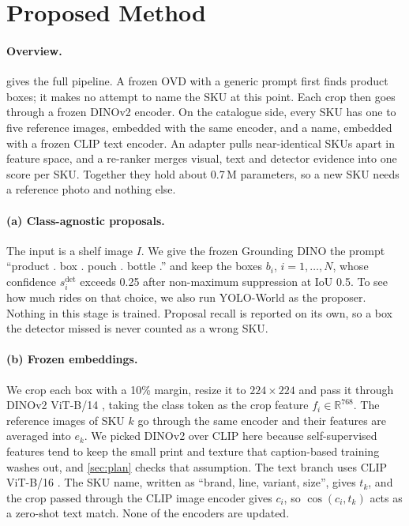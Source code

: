\section{Proposed Method}
\label{sec:method}

\paragraph{Overview.}
 gives the full pipeline. A frozen OVD with a generic prompt first finds product boxes; it makes no attempt to name the SKU at this point. Each crop then goes through a frozen DINOv2 encoder. On the catalogue side, every SKU has one to five reference images, embedded with the same encoder, and a name, embedded with a frozen CLIP text encoder. An adapter pulls near-identical SKUs apart in feature space, and a re-ranker merges visual, text and detector evidence into one score per SKU. Together they hold about 0.7\,M parameters, so a new SKU needs a reference photo and nothing else.

\paragraph{(a) Class-agnostic proposals.}
The input is a shelf image $I$. We give the frozen Grounding DINO \cite{liu2024groundingdino} the prompt ``product . box . pouch . bottle .'' and keep the boxes $b_i$, $i=1,\dots,N$, whose confidence $s^{\mathrm{det}}_i$ exceeds 0.25 after non-maximum suppression at IoU 0.5. To see how much rides on that choice, we also run YOLO-World \cite{cheng2024yoloworld} as the proposer. Nothing in this stage is trained. Proposal recall is reported on its own, so a box the detector missed is never counted as a wrong SKU.

\paragraph{(b) Frozen embeddings.}
We crop each box with a 10\% margin, resize it to $224\times224$ and pass it through DINOv2 ViT-B/14 \cite{oquab2024dinov2}, taking the class token as the crop feature $f_i\in\mathbb{R}^{768}$. The reference images of SKU $k$ go through the same encoder and their features are averaged into $e_k$. We picked DINOv2 over CLIP here because self-supervised features tend to keep the small print and texture that caption-based training washes out, and \cref{sec:plan} checks that assumption. The text branch uses CLIP ViT-B/16 \cite{radford2021clip}. The SKU name, written as ``brand, line, variant, size'', gives $t_k$, and the crop passed through the CLIP image encoder gives $c_i$, so $\cos(c_i,t_k)$ acts as a zero-shot text match. None of the encoders are updated.

